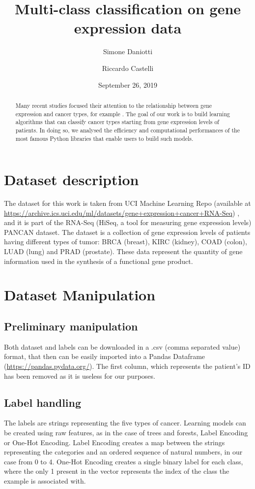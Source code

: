 \documentclass[12pt]{article}
\title{Multi-class classification on gene expression data}
\author[1]{Simone Daniotti}
\author[2]{Riccardo Castelli}
\affil[1]{Physics Department, University of Milan}
\affil[2]{Informatics Department, University of Milan}
\date{September 26, 2019}
\begin{document}
 \maketitle
  

\begin{abstract}
Many recent studies focused their attention to the relationship between gene expression and cancer types, for example \cite{wang2018gene}. The goal of our work is to build learning algorithms that can classify cancer types starting from gene expression levels of patients. In doing so, we analysed the efficiency and computational performances of the most famous Python libraries that enable users to build such models.
\end{abstract}


\newpage
\tableofcontents

\newpage
\section{Dataset description}

The dataset for this work is taken from UCI Machine Learning Repo (available at \url{https://archive.ics.uci.edu/ml/datasets/gene+expression+cancer+RNA-Seq}) \cite{Dua:2019}, and it is part of the RNA-Seq (HiSeq, a tool for measuring gene expression levels) PANCAN dataset. The dataset is a collection of gene expression levels of patients having different types of tumor: BRCA (breast), KIRC (kidney), COAD (colon), LUAD (lung) and PRAD (prostate).
These data represent the quantity of gene information used in the synthesis of a functional gene product. 


\section{Dataset Manipulation}


\subsection{Preliminary manipulation}
Both dataset and labels can be downloaded in a .csv (comma separated value) format, that then can be easily imported into a Pandas Dataframe (\url{https://pandas.pydata.org/}). The first column, which represents the patient's ID has been removed as it is useless for our purposes.


\subsection{Label handling}
The labels are strings representing the five types of cancer. Learning models can be created using raw features, as in the case of trees and forests, Label Encoding or One-Hot Encoding.
Label Encoding creates a map between the strings representing the categories and an ordered sequence of natural numbers, in our case from 0 to 4.
One-Hot Encoding creates a single binary label for each class, where the only 1 present in the vector represents the index of the class the example is associated with.  
\end{document}
